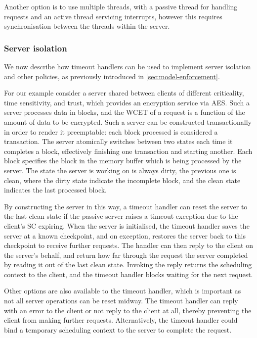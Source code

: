 Another option is to use multiple threads, with a passive thread for handling requests and an active
thread servicing interrupts, however this requires synchronisation between the threads within the
server.

\subsubsection{Server isolation}

We now describe how timeout handlers can be used to implement server isolation and other policies,
as previously introduced in \cref{sec:model-enforcement}. 

For our example consider a server shared between clients of different criticality, time sensitivity,
and trust, which provides an encryption service via AES. 
Such a server processes data in blocks, and the \gls{WCET} of a request is a function of the 
amount of data to be encrypted. Such a server can be constructed transactionally in order
to render it preemptable: each block processed is considered a transaction. The server atomically
switches between two states each time it completes a block, effectively finishing one transaction
and starting another. Each block specifies the block in the memory buffer which is being processed by the
server. The state the server is working on is always dirty, the previous one is clean, where the dirty
state indicate the incomplete block, and the clean state indicates the last processed block.

By constructing the server in this way, a timeout handler can reset the server to the last clean
state if the passive server raises a timeout exception due to the client's \gls{SC} expiring. 
When the server is initialised, the timeout handler saves the server at a known checkpoint, and on
exception, restores the server back to this checkpoint to receive further requests.
The handler can then reply to the client on the server's behalf, and return how
far through the request the server completed by reading it out of the last clean state. Invoking the
reply returns the scheduling context to the client, and the timeout handler blocks waiting for the
next request.

Other options are also available to the timeout handler, which is important as not all server
operations can be reset midway. The timeout handler can reply with an error to the client or  
not reply to the client at all, thereby preventing the client from making further requests.
Alternatively, the timeout handler could  
bind a temporary scheduling context to the server to complete the request. 

